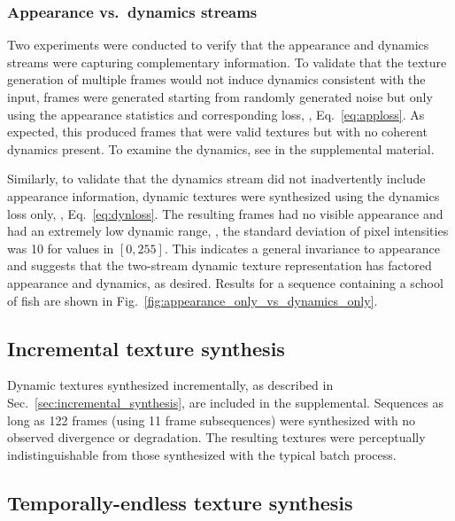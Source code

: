 \clearpage

\clearpage

\subsubsection{Appearance vs.\ dynamics streams}

Two experiments were conducted to verify that the appearance and dynamics
streams were capturing complementary information.
To validate that the texture generation of multiple frames
would not induce dynamics consistent with the input, frames were generated
starting from randomly generated noise but only using the
appearance statistics and corresponding loss, \ie,
Eq.\ \ref{eq:apploss}.
As expected, this produced frames that were valid textures but
with no coherent dynamics present.
To examine the dynamics, see 
 in the supplemental material.

Similarly, to validate that the dynamics stream did not 
inadvertently include appearance information, dynamic textures were synthesized
using the dynamics loss only, \ie, Eq.\ \ref{eq:dynloss}.
The resulting frames had no visible appearance and had
an extremely low dynamic range, \ie, the standard
deviation of pixel intensities was 10 for values in $[0,255]$.
This indicates a general invariance to appearance and 
suggests that the two-stream dynamic texture representation
has factored appearance and dynamics, as desired.
Results for a sequence containing a school of fish are shown in
Fig.\ \ref{fig:appearance_only_vs_dynamics_only}.



\subsection{Incremental texture synthesis}

Dynamic textures synthesized incrementally, as described in Sec.\
\ref{sec:incremental_synthesis}, are included in the supplemental.
Sequences as long as 122 frames (using 11 frame subsequences) were synthesized
with no observed divergence or degradation. The resulting textures were 
perceptually indistinguishable from those synthesized with the typical batch process.

\subsection{Temporally-endless texture synthesis}

